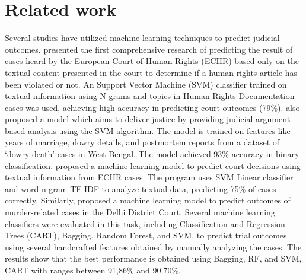 \documentclass[sn-mathphys,Numbered]{sn-jnl}%
\theoremstyle{thmstyleone}%
\theoremstyle{thmstyletwo}%
\theoremstyle{thmstylethree}%
\begin{document}
\section{Related work}\label{sec:Related}


Several studies have utilized machine learning techniques to predict judicial outcomes. \citet{aletras2016predicting} presented the first comprehensive research of predicting the result of cases heard by the European Court of Human Rights (ECHR) based only on the textual content presented in the court to determine if a human rights article has been violated or not. An Support Vector Machine (SVM) classifier trained on textual information using N-grams and topics in Human Rights Documentation cases was used, achieving high accuracy in predicting court outcomes (79\%). \citet{sil2020novel} also proposed a model which aims to deliver justice by providing judicial argument-based analysis using the SVM algorithm. The model is trained on  features like years of marriage, dowry details, and postmortem reports from a dataset of ‘dowry death’ cases in West Bengal. The model achieved 93\% accuracy in binary classification.  \citet{medvedeva2020using} proposed a machine learning model to predict court decisions using textual information from ECHR cases. The program uses SVM Linear classifier and word n-gram TF-IDF to analyze textual data, predicting 75\% of cases correctly. 
Similarly, \citet{shaikh2020predicting} proposed a machine learning model to predict outcomes of murder-related cases in the Delhi  District  Court. Several machine learning classifiers were evaluated in this task, including Classification and Regression Trees (CART), Bagging, Random Forest, and SVM, to predict trial outcomes using several handcrafted features obtained by manually analyzing the cases. The results show that the best performance is obtained using Bagging, RF, and SVM, CART with ranges between 91,86\% and 90.70\%. %
\end{document}
